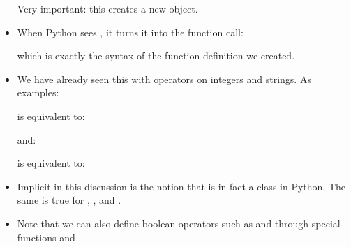 \documentclass[letterpaper,10pt,english]{sphinxmanual}
\begin{document}
\begin{itemize}
Very important: this creates a new  object.

\item {} 
When Python sees , it turns it into the function call:

\begin{sphinxVerbatim}[commandchars=\\\{\}]
 
\end{sphinxVerbatim}

which is exactly the syntax of the function definition we created.

\item {} 
We have already seen this with operators on integers and strings.
As examples:

\begin{sphinxVerbatim}[commandchars=\\\{\}]
  
\end{sphinxVerbatim}

is equivalent to:

\begin{sphinxVerbatim}[commandchars=\\\{\}]
 
\end{sphinxVerbatim}

and:

\begin{sphinxVerbatim}[commandchars=\\\{\}]
\end{sphinxVerbatim}

is equivalent to:

\begin{sphinxVerbatim}[commandchars=\\\{\}]
\end{sphinxVerbatim}

\item {} 
Implicit in this discussion is the notion that  is in fact a
class in Python.  The same is true for , , and
.

\item {} 
Note that we can also define boolean operators such as \sphinxcode{\sphinxupquote{==}} and \sphinxcode{\sphinxupquote{!=}}
through special functions  and .

\end{itemize}
\end{document}
